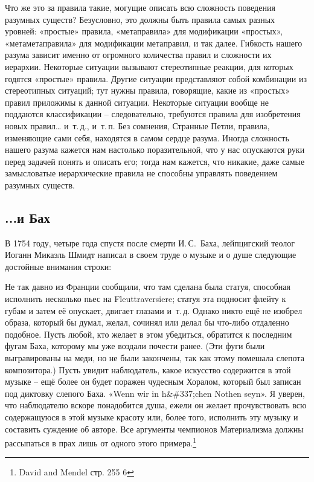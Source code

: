 \documentclass[../main.tex]{subfiles}
\begin{document}
Что же это за правила такие, могущие описать всю сложность поведения разумных существ? Безусловно, это должны быть правила самых разных уровней: «простые» правила, «метаправила» для модификации «простых», «метаметаправила» для модификации метаправил, и так далее. Гибкость нашего разума зависит именно от огромного количества правил и сложности их иерархии. Некоторые ситуации вызывают стереотипные реакции, для которых годятся «простые» правила. Другие ситуации представляют собой комбинации из стереотипных ситуаций; тут нужны правила, говорящие, какие из «простых» правил приложимы к данной ситуации. Некоторые ситуации вообще не поддаются классификации \--- следовательно, требуются правила для изобретения новых правил\ldots{} и~т.\,д., и~т.\,п. Без сомнения, Странные Петли, правила, изменяющие сами себя, находятся в самом сердце разума. Иногда сложность нашего разума кажется нам настолько поразительной, что у нас опускаются руки перед задачей понять и описать его; тогда нам кажется, что никакие, даже самые замысловатые иерархические правила не способны управлять поведением разумных существ.


\subsection{...и Бах}

В 1754 году, четыре года спустя после смерти И.\,С.~Баха, лейпцигский теолог Иоганн Микаэль Шмидт написал в своем труде о музыке и о душе следующие достойные внимания строки:

Не так давно из Франции сообщили, что там сделана была статуя, способная исполнить несколько пьес на Fleuttraversiere; статуя эта подносит флейту к губам и затем её опускает, двигает глазами и~т.\,д. Однако никто ещё не изобрел образа, который бы думал, желал, сочинял или делал бы что-либо отдаленно подобное. Пусть любой, кто желает в этом убедиться, обратится к последним фугам Баха, которому мы уже воздали почести ранее. (Эти фуги были выгравированы на меди, но не были закончены, так как этому помешала слепота композитора.) Пусть увидит наблюдатель, какое искусство содержится в этой музыке \--- ещё более он будет поражен чудесным Хоралом, который был записан под диктовку слепого Баха. «Wenn wir in h\&\#337;chen Nothen seyn». Я уверен, что наблюдателю вскоре понадобится душа, ежели он желает прочувствовать всю содержащуюся в этой музыке красоту или, более того, исполнить эту музыку и составить суждение об авторе. Все аргументы чемпионов Материализма должны рассыпаться в прах лишь от одного этого примера.\footnote{David and Mendel стр. 255 6}
\end{document}
